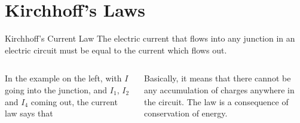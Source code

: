 \documentclass[12pt,aspectratio=169]{beamer}
\newcommand{\eq}[2]{\vspace{#1}{\Large\begin{displaymath}#2\end{displaymath}}}
\begin{document}
\section{Kirchhoff's Laws}

\begin{frame}{Kirchhoff's Current Law}
  The electric current that flows into any junction in an electric circuit must
  be equal to the current which flows out.

  \vspace{.2in}
  \begin{columns}

    In the example on the left, with $I$ going into the junction, and $I_1$,
    $I_2$ and $I_4$ coming out, the current law says that

    \eq{-.2in}{
      I=I_1+I_2+I_3
    }

    \vspace{-.1in}Basically, it means that there cannot be any accumulation of
    charges anywhere in the circuit. The law is a consequence of conservation of
    energy.
  \end{columns}
\end{frame}
\end{document}
